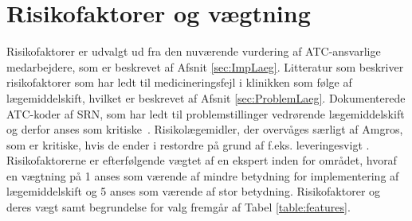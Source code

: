 \section{Risikofaktorer og vægtning}
Risikofaktorer er udvalgt ud fra den nuværende vurdering af ATC-ansvarlige medarbejdere, som er beskrevet af Afsnit \ref{sec:ImpLaeg}. Litteratur som beskriver risikofaktorer som har ledt til medicineringsfejl i klinikken som følge af lægemiddelskift, hvilket er beskrevet af Afsnit \ref{sec:ProblemLaeg}. Dokumenterede ATC-koder af SRN, som har ledt til problemstillinger vedrørende lægemiddelskift og derfor anses som kritiske~\citep{SRN}. Risikolægemidler, der overvåges særligt af Amgros, som er kritiske, hvis de ender i restordre på grund af f.eks. leveringesvigt \citep{Amgros}. Risikofaktorerne er efterfølgende vægtet af en ekspert inden for området, hvoraf en vægtning på 1 anses som værende af mindre betydning for implementering af lægemiddelskift og 5 anses som værende af stor betydning. Risikofaktorer og deres vægt samt begrundelse for valg fremgår af Tabel \ref{table:features}.

